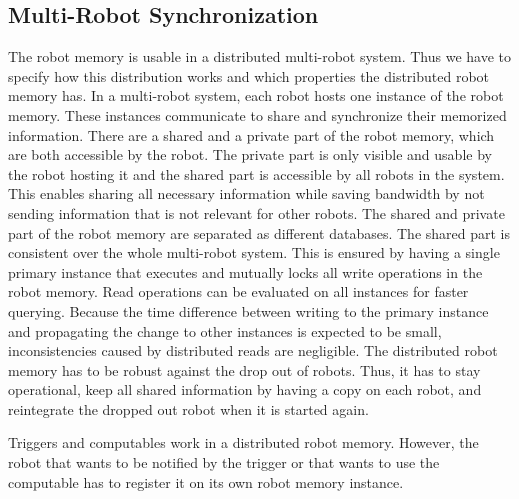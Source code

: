 \subsection{Multi-Robot Synchronization}
\label{sec:synchronization}
The robot memory is usable in a distributed multi-robot system. Thus
we have to specify how this distribution works and which properties
the distributed robot memory has. In a multi-robot system, each robot
hosts one instance of the robot memory. These instances communicate to
share and synchronize their memorized information. There are a shared
and a private part of the robot memory, which are both accessible by
the robot. The private part is only visible and usable by the robot
hosting it and the shared part is accessible by all robots in the
system. This enables sharing all necessary information while saving
bandwidth by not sending information that is not relevant for other
robots. The shared and private part of the robot memory are separated
as different databases. The shared part is consistent over the whole
multi-robot system. This is ensured by having a single primary
instance that executes and mutually locks all write operations in the
robot memory. Read operations can be evaluated on all instances for
faster querying. Because the time difference between writing to the
primary instance and propagating the change to other instances is
expected to be small, inconsistencies caused by distributed reads are
negligible. The distributed robot memory has to be robust against the
drop out of robots. Thus, it has to stay operational, keep all shared
information by having a copy on each robot, and reintegrate the dropped
out robot when it is started again.

Triggers and computables work in a distributed robot memory. However,
the robot that wants to be notified by the trigger or that wants to
use the computable has to register it on its own robot memory instance.

